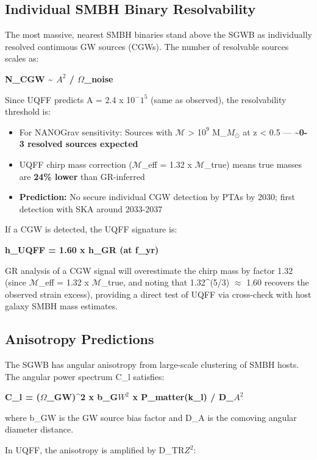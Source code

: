 \documentclass[12pt,a4paper]{article}
\begin{document}
\subsection{Individual SMBH Binary Resolvability}

The most massive, nearest SMBH binaries stand above the SGWB as individually resolved continuous GW sources (CGWs). The number of resolvable sources scales as:

\textbf{N\_CGW \textasciitilde{}  $A^{2}$ / $\Omega$\_noise}

Since UQFF predicts A = 2.4 x 1$0^{-}$$1^{5}$ (same as observed), the resolvability threshold is:

\begin{itemize}
  \item For NANOGrav sensitivity: Sources with $\mathcal{M}$ > 1$0^{9}$ M\_{$M_{\odot}$} at z < 0.5 --- \textbf{\textasciitilde{}0-3 resolved sources expected}
  \item UQFF chirp mass correction ($\mathcal{M}$\_eff = 1.32 x $\mathcal{M}$\_true) means true masses are \textbf{24\% lower} than GR-inferred
  \item \textbf{Prediction:} No secure individual CGW detection by PTAs by 2030; first detection with SKA around 2033-2037
\end{itemize}

If a CGW is detected, the UQFF signature is:

\textbf{h\_UQFF = 1.60 x h\_GR (at f\_yr)}

GR analysis of a CGW signal will overestimate the chirp mass by factor 1.32 (since $\mathcal{M}$\_eff = 1.32 x $\mathcal{M}$\_true, and noting that 1.32\^{}(5/3) $\approx$ 1.60 recovers the observed strain excess), providing a direct test of UQFF via cross-check with host galaxy SMBH mass estimates.

\subsection{Anisotropy Predictions}

The SGWB has angular anisotropy from large-scale clustering of SMBH hosts. The angular power spectrum C\_l satisfies:

\textbf{C\_l = ($\Omega$\_GW)\^{}2 x b\_G$W^{2}$ x P\_matter(k\_l) / D\_$A^{2}$}

where b\_GW is the GW source bias factor and D\_A is the comoving angular diameter distance.

In UQFF, the anisotropy is amplified by D\_TR$Z^{2}$:
\end{document}
